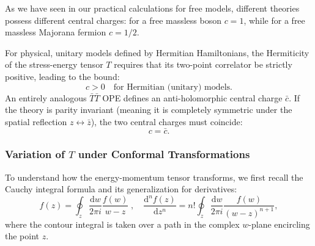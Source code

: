 As we have seen in our practical calculations for free models, different theories possess different central charges: for a free massless boson \(c = 1\), while for a free massless Majorana fermion \(c = 1/2\).

For physical, unitary models defined by Hermitian Hamiltonians, the Hermiticity of the stress-energy tensor \(T\) requires that its two-point correlator be strictly positive, leading to the bound:
\[
    c > 0 \quad \text{for Hermitian (unitary) models}.
\]
An entirely analogous \(\bar{T}\bar{T}\) OPE defines an anti-holomorphic central charge \(\bar{c}\). If the theory is parity invariant (meaning it is completely symmetric under the spatial reflection \(z \leftrightarrow \bar{z}\)), the two central charges must coincide:
\[
    c = \bar{c}.
\]

\subsubsection{Variation of \(T\) under Conformal Transformations}

To understand how the energy-momentum tensor transforms, we first recall the Cauchy integral formula and its generalization for derivatives:
\[
    f(z) = \oint_z \frac{\mathrm{d} w}{2\pi i} \frac{f(w)}{w - z} \;, \quad \frac{\mathrm{d}^n f(z)}{\mathrm{d}z^n} = n! \oint_z \frac{\mathrm{d} w}{2\pi i} \frac{f(w)}{(w - z)^{n+1}},
\]
where the contour integral is taken over a path in the complex \(w\)-plane encircling the point \(z\).

